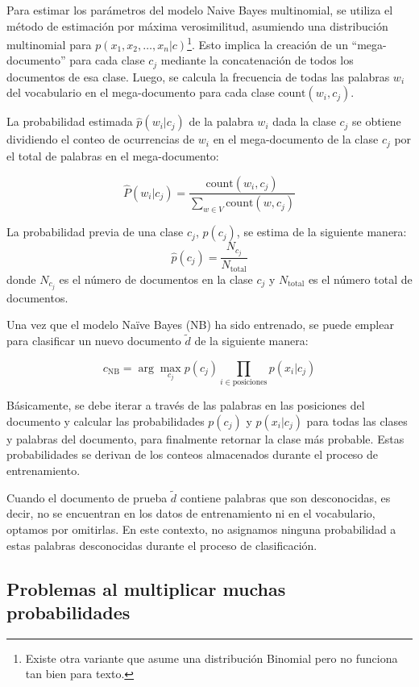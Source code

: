 Para estimar los parámetros del modelo Naive Bayes multinomial, se utiliza el método de estimación por máxima verosimilitud, asumiendo una distribución multinomial para $p(x_1, x_2, \ldots, x_n | c)$\footnote{Existe otra variante que asume una distribución Binomial pero no funciona tan bien para texto.}. Esto implica la creación de un ``mega-documento'' para cada clase $c_j$ mediante la concatenación de todos los documentos de esa clase. Luego, se calcula la frecuencia de todas las palabras $w_i$ del vocabulario en el mega-documento para cada clase $\text{count}(w_i, c_j)$.

La probabilidad estimada $\hat{p}(w_i | c_j)$ de la palabra $w_i$ dada la clase $c_j$ se obtiene dividiendo el conteo de ocurrencias de $w_i$ en el mega-documento de la clase $c_j$ por el total de palabras en el mega-documento:

\[
\hat{P}(w_i | c_j) = \frac{{\text{count}(w_i, c_j)}}{\sum_{w\in V}{\text{count}(w, c_j)}}
\]


La probabilidad previa de una clase $c_j$, $p(c_j)$, se estima de la siguiente manera:
    \[
    \hat{p}(c_j) = \frac{N_{c_j}}{N_{\text{total}}}
    \]
donde $N_{c_j}$ es el número de documentos en la clase $c_j$ y $N_{\text{total}}$ es el número total de documentos.


Una vez que el modelo Naïve Bayes (NB) ha sido entrenado, se puede emplear para clasificar un nuevo documento $\tilde{d}$ de la siguiente manera:

\[
c_{\text{NB}} = \arg\max_{c_j} p(c_j) \prod_{i \in \text{posiciones}} p(x_i | c_j)
\]

Básicamente, se debe iterar a través de las palabras en las posiciones del documento y calcular las probabilidades $p(c_j)$ y $p(x_i | c_j)$ para todas las clases y palabras del documento, para finalmente retornar la clase más probable. Estas probabilidades se derivan de los conteos almacenados durante el proceso de entrenamiento.

Cuando el documento de prueba $\tilde{d}$ contiene palabras que son desconocidas, es decir, no se encuentran en los datos de entrenamiento ni en el vocabulario, optamos por omitirlas. En este contexto, no asignamos ninguna probabilidad a estas palabras desconocidas durante el proceso de clasificación.

\subsection{Problemas al multiplicar muchas probabilidades}

